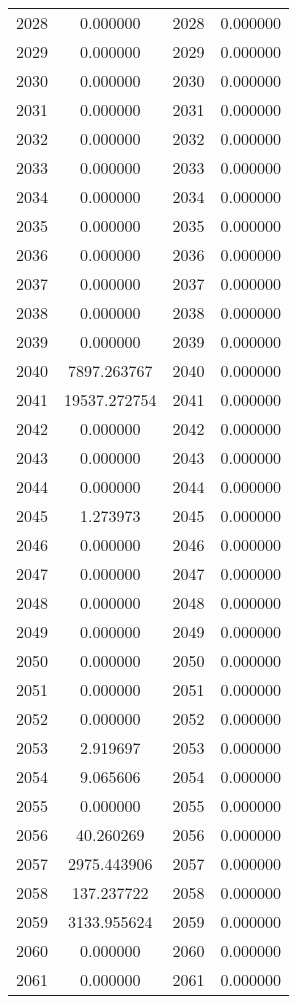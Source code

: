\documentclass[12pt]{article}
\begin{document}
\begin{longtable}{@{}cccc@{}}
2028 & 0.000000 & 2028 & 0.000000 \\
2029 & 0.000000 & 2029 & 0.000000 \\
2030 & 0.000000 & 2030 & 0.000000 \\
2031 & 0.000000 & 2031 & 0.000000 \\
2032 & 0.000000 & 2032 & 0.000000 \\
2033 & 0.000000 & 2033 & 0.000000 \\
2034 & 0.000000 & 2034 & 0.000000 \\
2035 & 0.000000 & 2035 & 0.000000 \\
2036 & 0.000000 & 2036 & 0.000000 \\
2037 & 0.000000 & 2037 & 0.000000 \\
2038 & 0.000000 & 2038 & 0.000000 \\
2039 & 0.000000 & 2039 & 0.000000 \\
2040 & 7897.263767 & 2040 & 0.000000 \\
2041 & 19537.272754 & 2041 & 0.000000 \\
2042 & 0.000000 & 2042 & 0.000000 \\
2043 & 0.000000 & 2043 & 0.000000 \\
2044 & 0.000000 & 2044 & 0.000000 \\
2045 & 1.273973 & 2045 & 0.000000 \\
2046 & 0.000000 & 2046 & 0.000000 \\
2047 & 0.000000 & 2047 & 0.000000 \\
2048 & 0.000000 & 2048 & 0.000000 \\
2049 & 0.000000 & 2049 & 0.000000 \\
2050 & 0.000000 & 2050 & 0.000000 \\
2051 & 0.000000 & 2051 & 0.000000 \\
2052 & 0.000000 & 2052 & 0.000000 \\
2053 & 2.919697 & 2053 & 0.000000 \\
2054 & 9.065606 & 2054 & 0.000000 \\
2055 & 0.000000 & 2055 & 0.000000 \\
2056 & 40.260269 & 2056 & 0.000000 \\
2057 & 2975.443906 & 2057 & 0.000000 \\
2058 & 137.237722 & 2058 & 0.000000 \\
2059 & 3133.955624 & 2059 & 0.000000 \\
2060 & 0.000000 & 2060 & 0.000000 \\
2061 & 0.000000 & 2061 & 0.000000 \\

\end{longtable}
\end{document}
